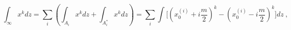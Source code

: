 \begin{equation}
\int_{\infty} x^k dz= \sum_i (\int_{A_i}x^k dz+ \int_{A_i^*}x^k dz)=
\sum_i \int \Big[(x_0^{(i)}+i\frac{m}{2})^k-(x_0^{(i)}-i\frac{m}{2})^k\Big]dz\ ,
\label{moments2}
\end{equation}

